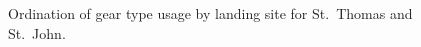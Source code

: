 \documentclass[
  letterpaper,
  oneside,
  open=any]{scrbook}
\begin{document}
\begin{figure}


\caption{\label{fig-NMDSSTT}Ordination of gear type usage by landing
site for St.~Thomas and St.~John.}

\end{figure}%
\end{document}
